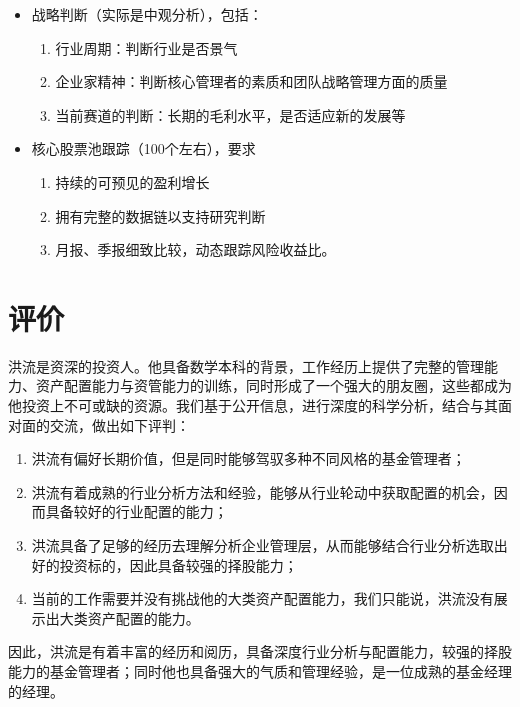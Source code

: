 \documentclass[hyperref,]{ctexart}
\providecommand{\tightlist}{%
  \setlength{\itemsep}{0pt}\setlength{\parskip}{0pt}}
\begin{document}
\begin{itemize}

\item 战略判断（实际是中观分析），包括：
\begin{enumerate}
\item 行业周期：判断行业是否景气
\item 企业家精神：判断核心管理者的素质和团队战略管理方面的质量
\item 当前赛道的判断：长期的毛利水平，是否适应新的发展等
\end{enumerate}
\item 核心股票池跟踪（100个左右），要求
\begin{enumerate}
\item 持续的可预见的盈利增长
\item 拥有完整的数据链以支持研究判断
\item 月报、季报细致比较，动态跟踪风险收益比。
\end{enumerate}
\end{itemize}

\section{评价}

洪流是资深的投资人。他具备数学本科的背景，工作经历上提供了完整的管理能力、资产配置能力与资管能力的训练，同时形成了一个强大的朋友圈，这些都成为他投资上不可或缺的资源。我们基于公开信息，进行深度的科学分析，结合与其面对面的交流，做出如下评判：

\begin{enumerate}
\def\labelenumi{\arabic{enumi}.}
\tightlist
\item
  洪流有偏好长期价值，但是同时能够驾驭多种不同风格的基金管理者；
\item
  洪流有着成熟的行业分析方法和经验，能够从行业轮动中获取配置的机会，因而具备较好的行业配置的能力；
\item
  洪流具备了足够的经历去理解分析企业管理层，从而能够结合行业分析选取出好的投资标的，因此具备较强的择股能力；
\item
  当前的工作需要并没有挑战他的大类资产配置能力，我们只能说，洪流没有展示出大类资产配置的能力。
\end{enumerate}

因此，洪流是有着丰富的经历和阅历，具备深度行业分析与配置能力，较强的择股能力的基金管理者；同时他也具备强大的气质和管理经验，是一位成熟的基金经理的经理。
\end{document}

